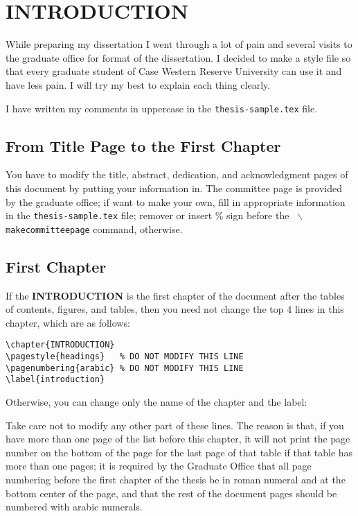 
\chapter{INTRODUCTION}
\pagestyle{headings}   %
\label{introduction}

While preparing my dissertation I went through a lot of pain and
several visits to the graduate office for format of the dissertation.
I decided to make a style file so that every graduate student of Case
Western Reserve University can use it and have less pain. I will try
my best to explain each thing clearly.

I have written my comments in uppercase in the {\tt thesis-sample.tex}
file.

\section{From Title Page to the First Chapter}
You have to modify the title, abstract, dedication, and acknowledgment
pages of this document by putting your information in. The committee
page is provided by the graduate office; if want to make your own,
fill in appropriate information in the {\tt thesis-sample.tex} file;
remover or insert \% sign before the {\tt
$\backslash$makecommitteepage} command, otherwise.

\section{First Chapter}

If the {\bf INTRODUCTION} is the first chapter of the document after
the tables of contents, figures, and tables, then you need
not change the top 4 lines in this chapter, which are as follows:\\

\begin{verbatim}
\chapter{INTRODUCTION}
\pagestyle{headings}   % DO NOT MODIFY THIS LINE
\pagenumbering{arabic} % DO NOT MODIFY THIS LINE
\label{introduction}
\end{verbatim}

Otherwise, you can change only the name of the chapter and the label:

Take care not to modify any other part of these lines. The reason is
that, if you have more than one page of the list before this chapter,
it will not print the page number on the bottom of the page for the
last page of that table if that table has more than one pages; it is
required by the Graduate Office that all page
numbering before the first chapter of the thesis be
in roman numeral and at the bottom center of the page,
and that the rest of the document pages should be numbered with
arabic numerals.
